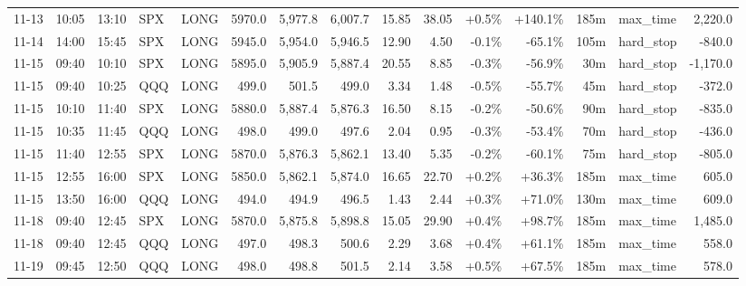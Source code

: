 \documentclass[11pt,a4paper,twoside]{article}
\begin{document}
\begin{landscape}
\begin{center}
\begin{longtable}{>{\color{txtmain}}l l l l l r r r r r r r r >{\color{txtmain}}l r}
11-13 & 10:05 & 13:10 & SPX & LONG & 5970.0 & 5,977.8 & 6,007.7 & 15.85 & 38.05 & \textcolor{wingreen}{+0.5\%} & \textcolor{wingreen}{+140.1\%} & 185m & max\_time & \textcolor{wingreen}{2,220.0} \\
11-14 & 14:00 & 15:45 & SPX & LONG & 5945.0 & 5,954.0 & 5,946.5 & 12.90 & 4.50 & \textcolor{lossred}{-0.1\%} & \textcolor{lossred}{-65.1\%} & 105m & hard\_stop & \textcolor{lossred}{-840.0} \\
11-15 & 09:40 & 10:10 & SPX & LONG & 5895.0 & 5,905.9 & 5,887.4 & 20.55 & 8.85 & \textcolor{lossred}{-0.3\%} & \textcolor{lossred}{-56.9\%} & 30m & hard\_stop & \textcolor{lossred}{-1,170.0} \\
11-15 & 09:40 & 10:25 & QQQ & LONG & 499.0 & 501.5 & 499.0 & 3.34 & 1.48 & \textcolor{lossred}{-0.5\%} & \textcolor{lossred}{-55.7\%} & 45m & hard\_stop & \textcolor{lossred}{-372.0} \\
11-15 & 10:10 & 11:40 & SPX & LONG & 5880.0 & 5,887.4 & 5,876.3 & 16.50 & 8.15 & \textcolor{lossred}{-0.2\%} & \textcolor{lossred}{-50.6\%} & 90m & hard\_stop & \textcolor{lossred}{-835.0} \\
11-15 & 10:35 & 11:45 & QQQ & LONG & 498.0 & 499.0 & 497.6 & 2.04 & 0.95 & \textcolor{lossred}{-0.3\%} & \textcolor{lossred}{-53.4\%} & 70m & hard\_stop & \textcolor{lossred}{-436.0} \\
11-15 & 11:40 & 12:55 & SPX & LONG & 5870.0 & 5,876.3 & 5,862.1 & 13.40 & 5.35 & \textcolor{lossred}{-0.2\%} & \textcolor{lossred}{-60.1\%} & 75m & hard\_stop & \textcolor{lossred}{-805.0} \\
11-15 & 12:55 & 16:00 & SPX & LONG & 5850.0 & 5,862.1 & 5,874.0 & 16.65 & 22.70 & \textcolor{wingreen}{+0.2\%} & \textcolor{wingreen}{+36.3\%} & 185m & max\_time & \textcolor{wingreen}{605.0} \\
11-15 & 13:50 & 16:00 & QQQ & LONG & 494.0 & 494.9 & 496.5 & 1.43 & 2.44 & \textcolor{wingreen}{+0.3\%} & \textcolor{wingreen}{+71.0\%} & 130m & max\_time & \textcolor{wingreen}{609.0} \\
11-18 & 09:40 & 12:45 & SPX & LONG & 5870.0 & 5,875.8 & 5,898.8 & 15.05 & 29.90 & \textcolor{wingreen}{+0.4\%} & \textcolor{wingreen}{+98.7\%} & 185m & max\_time & \textcolor{wingreen}{1,485.0} \\
11-18 & 09:40 & 12:45 & QQQ & LONG & 497.0 & 498.3 & 500.6 & 2.29 & 3.68 & \textcolor{wingreen}{+0.4\%} & \textcolor{wingreen}{+61.1\%} & 185m & max\_time & \textcolor{wingreen}{558.0} \\
11-19 & 09:45 & 12:50 & QQQ & LONG & 498.0 & 498.8 & 501.5 & 2.14 & 3.58 & \textcolor{wingreen}{+0.5\%} & \textcolor{wingreen}{+67.5\%} & 185m & max\_time & \textcolor{wingreen}{578.0} \\

\end{longtable}
\end{center}
\end{landscape}
\end{document}
